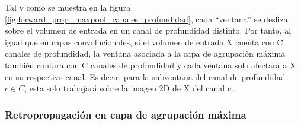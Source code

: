 Tal y como se muestra en la figura \ref{fig:forward_prop_maxpool_canales_profundidad}, cada ``ventana'' se desliza sobre el volumen de entrada en un canal de profundidad distinto. Por tanto, al igual que en capas convolucionales, si el volumen de entrada X cuenta con C canales de profundidad, la ventana asociada a la capa de agrupación máxima también contará con C canales de profundidad y cada ventana solo afectará a X en su respectivo canal. Es decir, para la subventana del canal de profundidad $c \in C$, esta solo trabajará sobre la imagen 2D de X del canal c.

\subsubsection{Retropropagación en capa de agrupación máxima}

